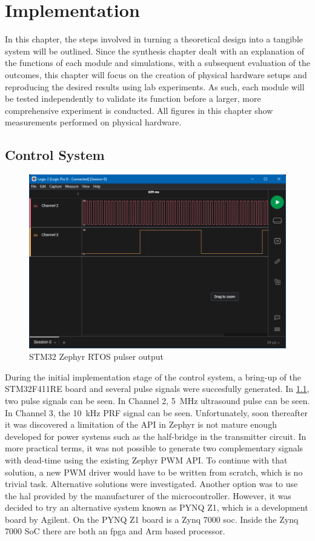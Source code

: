 \chapter{Implementation}
In this chapter, the steps involved in turning a theoretical design into a tangible system will be outlined. Since the synthesis chapter dealt with an explanation of the functions of each module and simulations, with a subsequent evaluation of the outcomes, this chapter will focus on the creation of physical hardware setups and reproducing the desired results using lab experiments. As such, each module will be tested independently to validate its function before a larger, more comprehensive experiment is conducted. All figures in this chapter show measurements performed on physical hardware.
\section{Control System}
\begin{figure}[htbp]
	\centering
	\includegraphics[width=.8\textwidth]{Figures/4_controlsystem_stm32_zephyr.png}
	\caption{STM32 Zephyr RTOS pulser output}
	\label{fig:4_stm32_zephyr_pulser}
\end{figure}
During the initial implementation stage of the control system, a bring-up of the STM32F411RE board and several pulse signals were succesfully generated. In \cref{fig:4_stm32_zephyr_pulser}, two pulse signals can be seen. In Channel 2, \qty{5}{\mega\hertz} ultrasound pulse can be seen. In Channel 3, the \qty{10}{\kilo\hertz} PRF signal can be seen. Unfortunately, soon thereafter it was discovered a limitation of the API in Zephyr is not mature enough developed for power systems such as the half-bridge in the transmitter circuit. In more practical terms, it was not possible to generate two complementary signals with dead-time using the existing Zephyr PWM API. To continue with that solution, a new PWM driver would have to be written from scratch, which is no trivial task. Alternative solutions were investigated. Another option was to use the \gls{hal} provided by the manufacturer of the microcontroller. However, it was decided to try an alternative system known as PYNQ Z1, which is a development board by Agilent. On the PYNQ Z1 board is a Zynq 7000 \gls{soc}. Inside the Zynq 7000 SoC there are both an \gls{fpga} and Arm based processor.

